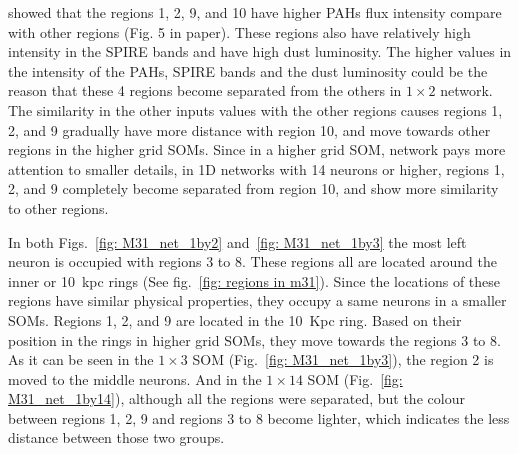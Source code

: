         \cite{Dim15} showed that the regions 1, 2, 9, and 10 have higher PAHs flux intensity compare with other regions (Fig. 5 in \cite{Dim15} paper). 
        These regions also have relatively high intensity in the SPIRE bands and have high dust luminosity.
        The higher values in the intensity of the PAHs, SPIRE bands and the dust luminosity could be the reason that these 4 regions become separated from the others in  $1\times2$ network.
        The similarity in the other inputs values with the other regions causes regions 1, 2, and 9 gradually have more distance with region 10, and move towards other regions in the higher grid SOMs.
        Since in a higher grid SOM, network pays more attention to smaller details, in 1D networks with 14 neurons or higher, regions 1, 2, and 9 completely become separated from region 10, and show more similarity to other regions.
        
        In both Figs.~\ref{fig: M31_net_1by2} and~\ref{fig: M31_net_1by3} the most left neuron is occupied with regions 3 to 8. 
        These regions all are located around the inner or 10~kpc rings (See fig.~\ref{fig: regions in m31}).%
        Since the locations of these regions have similar physical properties, they occupy a same neurons in a smaller SOMs.
        Regions 1, 2, and 9 are located in the 10~Kpc ring.
        Based on their position in the rings in higher grid SOMs, they move towards the regions 3 to 8.
        As it can  be seen in the $1\times3$ SOM (Fig.~\ref{fig: M31_net_1by3}), the region 2 is moved to the middle neurons.
        And in the $1\times14$ SOM (Fig.~\ref{fig: M31_net_1by14}), although all the regions were separated, but the colour between regions 1, 2, 9 and regions 3 to 8 become lighter, which indicates the less distance between those two groups.
        
